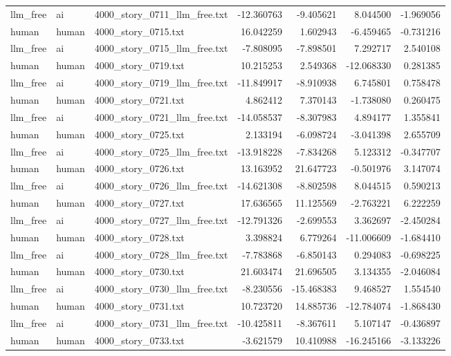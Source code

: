 \begin{longtable}{lllrrrr}
llm\_free & ai & 4000\_story\_0711\_llm\_free.txt & -12.360763 & -9.405621 & 8.044500 & -1.969056 \\
human & human & 4000\_story\_0715.txt & 16.042259 & 1.602943 & -6.459465 & -0.731216 \\
llm\_free & ai & 4000\_story\_0715\_llm\_free.txt & -7.808095 & -7.898501 & 7.292717 & 2.540108 \\
human & human & 4000\_story\_0719.txt & 10.215253 & 2.549368 & -12.068330 & 0.281385 \\
llm\_free & ai & 4000\_story\_0719\_llm\_free.txt & -11.849917 & -8.910938 & 6.745801 & 0.758478 \\
human & human & 4000\_story\_0721.txt & 4.862412 & 7.370143 & -1.738080 & 0.260475 \\
llm\_free & ai & 4000\_story\_0721\_llm\_free.txt & -14.058537 & -8.307983 & 4.894177 & 1.355841 \\
human & human & 4000\_story\_0725.txt & 2.133194 & -6.098724 & -3.041398 & 2.655709 \\
llm\_free & ai & 4000\_story\_0725\_llm\_free.txt & -13.918228 & -7.834268 & 5.123312 & -0.347707 \\
human & human & 4000\_story\_0726.txt & 13.163952 & 21.647723 & -0.501976 & 3.147074 \\
llm\_free & ai & 4000\_story\_0726\_llm\_free.txt & -14.621308 & -8.802598 & 8.044515 & 0.590213 \\
human & human & 4000\_story\_0727.txt & 17.636565 & 11.125569 & -2.763221 & 6.222259 \\
llm\_free & ai & 4000\_story\_0727\_llm\_free.txt & -12.791326 & -2.699553 & 3.362697 & -2.450284 \\
human & human & 4000\_story\_0728.txt & 3.398824 & 6.779264 & -11.006609 & -1.684410 \\
llm\_free & ai & 4000\_story\_0728\_llm\_free.txt & -7.783868 & -6.850143 & 0.294083 & -0.698225 \\
human & human & 4000\_story\_0730.txt & 21.603474 & 21.696505 & 3.134355 & -2.046084 \\
llm\_free & ai & 4000\_story\_0730\_llm\_free.txt & -8.230556 & -15.468383 & 9.468527 & 1.554540 \\
human & human & 4000\_story\_0731.txt & 10.723720 & 14.885736 & -12.784074 & -1.868430 \\
llm\_free & ai & 4000\_story\_0731\_llm\_free.txt & -10.425811 & -8.367611 & 5.107147 & -0.436897 \\
human & human & 4000\_story\_0733.txt & -3.621579 & 10.410988 & -16.245166 & -3.133226 \\

\end{longtable}
